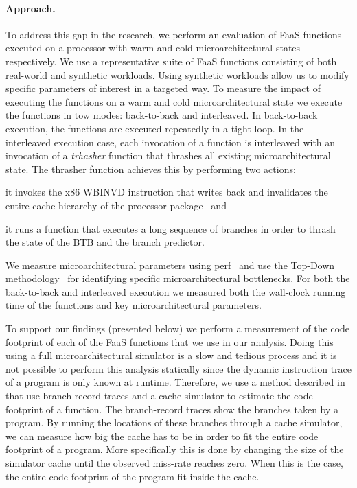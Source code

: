 \documentclass[../main.tex]{subfiles}
\begin{document}
\begin{refsection}
\paragraph{Approach.}
To address this gap in the research, we perform an evaluation of FaaS
functions executed on a processor with warm and cold
microarchitectural states respectively. We use a representative suite
of FaaS functions consisting of both real-world and synthetic
workloads. Using synthetic workloads allow us to modify specific
parameters of interest in a targeted way. To measure the impact of
executing the functions on a warm and cold microarchitectural state we
execute the functions in tow modes: back-to-back and interleaved. In
back-to-back execution, the functions are executed repeatedly in a
tight loop. In the interleaved execution case, each invocation of a
function is interleaved with an invocation of a \emph{trhasher}
function that thrashes all existing microarchitectural state. The
thrasher function achieves this by performing two
actions: \begin{inparaenum}[1)]
\item it invokes the x86 WBINVD
  instruction that writes back and invalidates the entire cache
  hierarchy of the processor package~\cite[Chapter 6]{intelmanual} and \item it runs a function that
  executes a long sequence of branches in order to thrash the state of
  the BTB and the branch predictor. \end{inparaenum} We measure
microarchitectural parameters using perf~\cite{perftool} and use the Top-Down
methodology~\cite{yasin14_top_down} for identifying specific
microarchitectural bottlenecks. For both the back-to-back and
interleaved execution we measured both the wall-clock running time of
the functions and key microarchitectural parameters.

To support our findings (presented below) we perform a measurement of
the code footprint of each of the FaaS functions that we use in our
analysis. Doing this using a full microarchitectural simulator is a
slow and tedious process and it is not possible to perform this
analysis statically since the dynamic instruction trace of a program
is only known at runtime.  Therefore, we use a method described
in~\cite{splash2} that use branch-record traces and a cache simulator
to estimate the code footprint of a function. The branch-record traces
show the branches taken by a program. By running the locations of
these branches through a cache simulator, we can measure how big the
cache has to be in order to fit the entire code footprint of a
program. More specifically this is done by changing the size of the
simulator cache until the observed miss-rate reaches zero. When this
is the case, the entire code footprint of the program fit inside the
cache.



\end{refsection}
\end{document}
